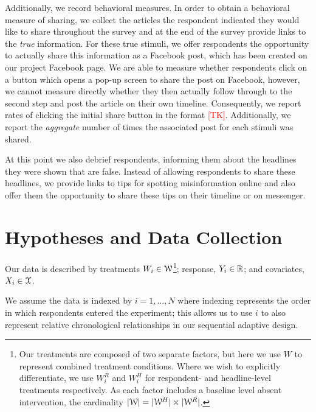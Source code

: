 \documentclass[letterpaper, 12pt, parskip=full,]{scrartcl}
\begin{document}
Additionally, we record behavioral measures. In order to obtain a behavioral measure of sharing, we collect the articles the respondent indicated they would like to share throughout the survey and at the end of the survey provide links to the \textit{true} information. For these true stimuli, we offer respondents the opportunity to actually share this information as a Facebook post, which has been created on our project Facebook page. We are able to measure whether respondents click on a button which opens a pop-up screen to share the post on Facebook, however, we cannot measure directly whether they then actually follow through to the second step and post the article on their own timeline. Consequently, we report rates of clicking the initial share button in the format \textcolor{red}{[TK]}. Additionally, we report the \textit{aggregate} number of times the associated post for each stimuli was shared.  

At this point we also debrief respondents, informing them about the headlines they were shown that are false. Instead of allowing respondents to share these headlines, we provide links to tips for spotting misinformation online and also offer them the opportunity to share these tips on their timeline or on messenger.




\section{Hypotheses and Data Collection}



Our data is described by treatments $W_i \in {\EuScript W}$\footnote{Our treatments are composed of two separate factors, but here we use $W$ to represent combined treatment conditions. Where we wish to explicitly differentiate, we use $W^R_i$ and $W^H_i$ for respondent- and headline-level treatments respectively. As each factor includes a baseline level absent intervention, the cardinality $|{\EuScript W}| = |{\EuScript W}^H|\times |{\EuScript W}^R|$.}; response,  $Y_i \in {\mathbb R}$; and covariates, $X_i \in {\EuScript X}$. 

We assume the data is indexed by $i = 1, \dots, N$ where indexing represents the order in which respondents entered the experiment; this allows us to use $i$ to also represent relative chronological relationships in our sequential adaptive design. 
\end{document}
